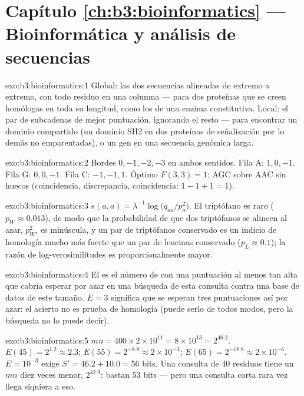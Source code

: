 \section*{Capítulo \ref{ch:b3:bioinformatics} --- Bioinformática y análisis de secuencias}

\begin{solution}{exo:b3:bioinformatics:1}
Global: las dos secuencias alineadas de extremo a extremo, con todo
residuo en una columna --- para dos proteínas que se creen homólogas en
toda su longitud, como los  de una enzima constitutiva. Local:
el par de subcadenas de mejor puntuación, ignorando el resto --- para
encontrar un dominio compartido (un dominio SH2 en dos proteínas de
señalización por lo demás no emparentadas), o un gen en una secuencia
genómica larga.
\end{solution}

\begin{solution}{exo:b3:bioinformatics:2}
Bordes $0,-1,-2,-3$ en ambos sentidos. Fila A: $1, 0, -1$.
Fila G: $0, 0, -1$. Fila C: $-1, -1, 1$. Óptimo $F(3,3) = 1$: AGC sobre
AAC sin huecos (coincidencia, discrepancia, coincidencia:
$1 - 1 + 1 = 1$).
\end{solution}

\begin{solution}{exo:b3:bioinformatics:3}
$s(a,a) = \lambda^{-1}\log\bigl(q_{aa}/p_{a}^{2}\bigr)$. El triptófano es
raro ($p_{W} \approx 0.013$), de modo que la probabilidad de que dos
triptófanos se alineen al azar, $p_{W}^{2}$, es minúscula, y un par de
triptófanos conservado es un indicio de homología mucho más fuerte que un
par de leucinas conservado ($p_{L}
\approx 0.1$); la razón de log-verosimilitudes es proporcionalmente
mayor.
\end{solution}

\begin{solution}{exo:b3:bioinformatics:4}
El  es el número de  con una puntuación al menos tan
alta que cabría esperar por azar en una búsqueda de esta consulta contra
una base de datos de este tamaño. $E = 3$ significa que se esperan tres
puntuaciones así por azar: el acierto no es prueba de homología (puede
serlo de todos modos, pero la búsqueda no lo puede decir).
\end{solution}

\begin{solution}{exo:b3:bioinformatics:5}
$mn = 400\times 2\times 10^{11} = 8\times 10^{13} = 2^{46.2}$. $E(45) =
2^{1.2} \approx 2.3$; $E(55) = 2^{-8.8} \approx 2\times 10^{-3}$;
$E(65) = 2^{-18.8} \approx 2\times 10^{-6}$. $E = 10^{-3}$ exige $S' =
46.2 + 10.0 = 56$ bits. Una consulta de \num{40} residuos tiene un $mn$
diez veces menor, $2^{42.9}$: bastan $53$ bits --- pero una consulta
corta rara vez llega siquiera a eso.
\end{solution}

